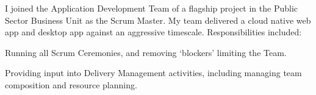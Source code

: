 I joined the Application Development Team of a flagship project in the Public Sector Business Unit as the Scrum Master.
My team delivered a cloud native web app and desktop app against an aggressive timescale.
Responsibilities included:
\vspace{0.25em}
\begin{tightemize}
  \item Running all Scrum Ceremonies, and removing `blockers' limiting the Team.
  \item Providing input into Delivery Management activities, including managing team composition and resource planning.
\end{tightemize}
\sectionsep{}
\vfill{}